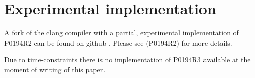 \section{Experimental implementation}
\label{implementation}

A fork of the clang compiler with a partial, experimental implementation
of P0194R2 can be found on github \cite{ReflexprImplementation}.
Please see \cite{Chochlik-P0194R2} (P0194R2) for more details.

Due to time-constraints there is no implementation of P0194R3 available
at the moment of writing of this paper.

